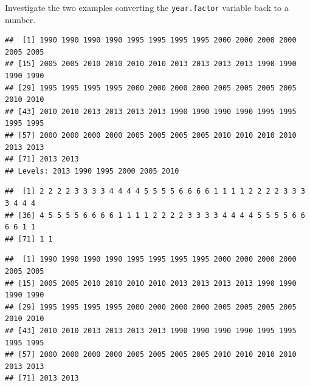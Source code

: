 \documentclass[12pt,]{krantz}
\makeatletter
\newenvironment{Shaded}{\begin{snugshade}}{\end{snugshade}}
\newcommand{\KeywordTok}[1]{\textcolor[rgb]{0.13,0.29,0.53}{\textbf{#1}}}
\newcommand{\NormalTok}[1]{#1}
\newcommand{\OperatorTok}[1]{\textcolor[rgb]{0.81,0.36,0.00}{\textbf{#1}}}
\newcommand{\StringTok}[1]{\textcolor[rgb]{0.31,0.60,0.02}{#1}}
\newenvironment{kframe}{%
\medskip{}
\setlength{\fboxsep}{.8em}
 \def\at@end@of@kframe{}%
 \ifinner\ifhmode%
  \def\at@end@of@kframe{\end{minipage}}%
  \begin{minipage}{\columnwidth}%
 \fi\fi%
 \def\FrameCommand##1{\hskip\@totalleftmargin \hskip-\fboxsep
 \colorbox{shadecolor}{##1}\hskip-\fboxsep
     \hskip-\linewidth \hskip-\@totalleftmargin \hskip\columnwidth}%
 \MakeFramed {\advance\hsize-\width
   \@totalleftmargin\z@ \linewidth\hsize
   \@setminipage}}%
 {\par\unskip\endMakeFramed%
 \at@end@of@kframe}
\renewenvironment{Shaded}{\begin{kframe}}{\end{kframe}}
\theoremstyle{definition}
\theoremstyle{definition}
\theoremstyle{definition}
\theoremstyle{remark}
\makeatother
\begin{document}
Investigate the two examples converting the \texttt{year.factor}
variable back to a number.

\begin{Shaded}
\end{Shaded}

\begin{verbatim}
##  [1] 1990 1990 1990 1990 1995 1995 1995 1995 2000 2000 2000 2000 2005 2005
## [15] 2005 2005 2010 2010 2010 2010 2013 2013 2013 2013 1990 1990 1990 1990
## [29] 1995 1995 1995 1995 2000 2000 2000 2000 2005 2005 2005 2005 2010 2010
## [43] 2010 2010 2013 2013 2013 2013 1990 1990 1990 1990 1995 1995 1995 1995
## [57] 2000 2000 2000 2000 2005 2005 2005 2005 2010 2010 2010 2010 2013 2013
## [71] 2013 2013
## Levels: 2013 1990 1995 2000 2005 2010
\end{verbatim}

\begin{Shaded}
\end{Shaded}

\begin{verbatim}
##  [1] 2 2 2 2 3 3 3 3 4 4 4 4 5 5 5 5 6 6 6 6 1 1 1 1 2 2 2 2 3 3 3 3 4 4 4
## [36] 4 5 5 5 5 6 6 6 6 1 1 1 1 2 2 2 2 3 3 3 3 4 4 4 4 5 5 5 5 6 6 6 6 1 1
## [71] 1 1
\end{verbatim}

\begin{Shaded}
\end{Shaded}

\begin{verbatim}
##  [1] 1990 1990 1990 1990 1995 1995 1995 1995 2000 2000 2000 2000 2005 2005
## [15] 2005 2005 2010 2010 2010 2010 2013 2013 2013 2013 1990 1990 1990 1990
## [29] 1995 1995 1995 1995 2000 2000 2000 2000 2005 2005 2005 2005 2010 2010
## [43] 2010 2010 2013 2013 2013 2013 1990 1990 1990 1990 1995 1995 1995 1995
## [57] 2000 2000 2000 2000 2005 2005 2005 2005 2010 2010 2010 2010 2013 2013
## [71] 2013 2013
\end{verbatim}
\end{document}
